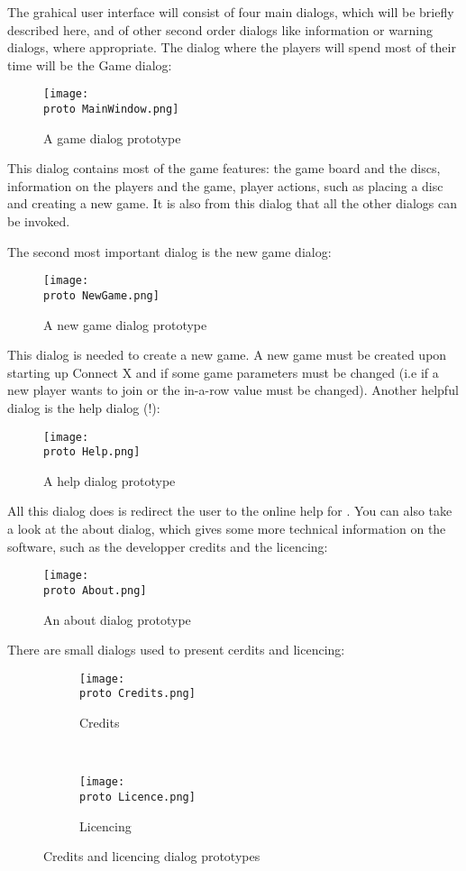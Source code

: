 The  grahical user interface will consist of four main dialogs,
which will be briefly described here, and of other second order dialogs like
information or warning dialogs, where appropriate. The dialog where the players
will spend most of their time will be the Game dialog:

\begin{figure}[H]
  \texttt{[image: \\proto MainWindow.png]}
  \caption{A game dialog prototype}
  \label{fig:Game}
\end{figure}

This dialog contains most of the game features: the game board and the discs,
information on the players and the game, player actions, such as placing a
disc and creating a new game. It is also from this dialog that all the other
dialogs can be invoked.

The second most important dialog is the new game dialog:

\begin{figure}[H]
  \texttt{[image: \\proto NewGame.png]}
  \caption{A new game dialog prototype}
  \label{fig:NewGame}
\end{figure}

This dialog is needed to create a new game. A new game must be created upon
starting up Connect X and if some game parameters must be changed (i.e if
a new player wants to join or the in-a-row value must be changed). Another
helpful dialog is the help dialog (!):

\begin{figure}[H]
  \texttt{[image: \\proto Help.png]}
  \caption{A help dialog prototype}
  \label{fig:Help}
\end{figure}

All this dialog does is redirect the user to the online help for .
You can also take a look at the about dialog, which gives some more technical
information on the software, such as the developper credits and the licencing:

\begin{figure}[H]
  \texttt{[image: \\proto About.png]}
  \caption{An about dialog prototype}
  \label{fig:AboutCX}
\end{figure}

There are small dialogs used to present cerdits and licencing:

\begin{figure}[H]
  \centering

    \begin{subfigure}[b]{0.42\textwidth}
      \texttt{[image: \\proto Credits.png]}
      \caption{Credits}
      \label{fig:Credits}
    \end{subfigure}
    ~
    \begin{subfigure}[b]{0.42\textwidth}
      \texttt{[image: \\proto Licence.png]}
      \caption{Licencing}
      \label{fig:Licence}
    \end{subfigure}

  \caption{Credits and licencing dialog prototypes}
  \label{fig:CreditsLicence}
\end{figure}

